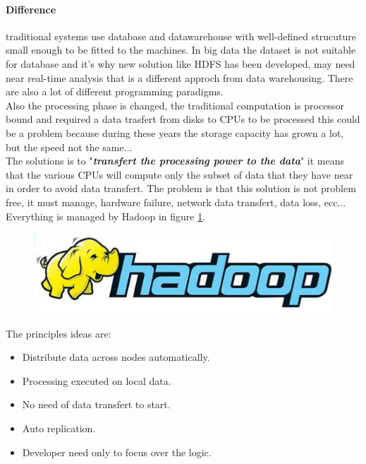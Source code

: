 \documentclass[12pt]{article}
\begin{document}
\paragraph{Difference} traditional systems use database and datawarehouse with well-defined strucuture small enough to be fitted to the machines. In big data the dataset is not suitable for database and it's why new solution like HDFS has been developed, may need near real-time analysis that is a different approch from data warehousing. There are also a lot of different programming paradigms.\\
Also the processing phase is changed, the traditional computation is processor bound and required a data trasfert from disks to CPUs to be processed this could be a problem because during these years the storage capacity has grown a lot, but the speed not the same...\\
The solutions is to "\textit{\textbf{transfert the processing power to the data}}" it means that the various CPUs will compute only the subset of data that they have near in order to avoid data transfert. The problem is that this solution is not problem free, it must manage, hardware failure, network data transfert, data loss, ecc... Everything is managed by Hadoop in figure \ref{fig:hadoop}.
\begin{figure}[hp!]
  \includegraphics[width=\linewidth]{images/hadoop.png}
  \label{fig:hadoop}
\end{figure}
The principles ideas are:
\begin{itemize}
  \item Distribute data across nodes automatically.
  \item Processing executed on local data.
  \item No need of data transfert to start.
  \item Auto replication.
  \item Developer need only to focus over the logic.
\end{itemize}
\end{document}
